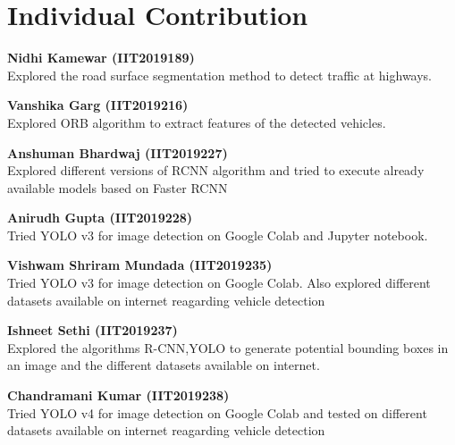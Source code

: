 \documentclass[12pt,a4paper,roman]{article}
\begin{document}
\newpage
\section{Individual Contribution}

\vspace{3mm}
\textbf{Nidhi Kamewar (IIT2019189)\\}
{Explored the road surface segmentation method to detect traffic at highways.}
\vspace{4mm}

\hspace{-6mm}\textbf{Vanshika Garg (IIT2019216)\\}
{Explored ORB algorithm to extract features of the detected vehicles.}
\vspace{4mm}

\hspace{-6mm}\textbf{Anshuman Bhardwaj (IIT2019227)\\}
{Explored different versions of RCNN algorithm and tried to execute already available models based on Faster RCNN}
\vspace{4mm}

\hspace{-6mm}\textbf{Anirudh Gupta (IIT2019228)\\}
{Tried YOLO v3 for image detection on Google Colab and Jupyter notebook. }
\vspace{4mm}

\hspace{-6mm}\textbf{Vishwam Shriram Mundada (IIT2019235)\\}
{Tried YOLO v3 for image detection on Google Colab. Also explored different datasets available on internet reagarding vehicle detection }
\vspace{4mm}

\hspace{-6mm}\textbf{Ishneet Sethi (IIT2019237)\\}
{Explored the algorithms R-CNN,YOLO to generate potential bounding boxes in an image and the different datasets available on internet. }
\vspace{4mm}

\hspace{-6mm}\textbf{Chandramani Kumar (IIT2019238)\\}
{Tried YOLO v4 for image detection on Google Colab and tested on different datasets available on internet reagarding vehicle detection }
\vspace{4mm}

\newpage
\end{document}

